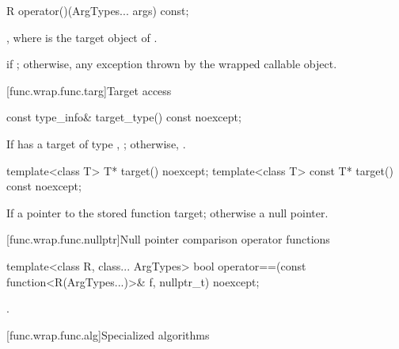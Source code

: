 %
%
\begin{itemdecl}
R operator()(ArgTypes... args) const;
\end{itemdecl}

\begin{itemdescr}
\pnum
\returns
{},
where  is the target object of .

\pnum
\throws
{} if ; otherwise, any
exception thrown by the wrapped callable object.
\end{itemdescr}

[func.wrap.func.targ]{Target access}

%
\begin{itemdecl}
const type_info& target_type() const noexcept;
\end{itemdecl}

\begin{itemdescr}
\pnum
\returns
If  has a target of type ,
  ; otherwise, .
\end{itemdescr}

%
\begin{itemdecl}
template<class T>       T* target() noexcept;
template<class T> const T* target() const noexcept;
\end{itemdecl}

\begin{itemdescr}
\pnum
\returns
If 
a pointer to the stored function target; otherwise a null pointer.
\end{itemdescr}

[func.wrap.func.nullptr]{Null pointer comparison operator functions}

%
\begin{itemdecl}
template<class R, class... ArgTypes>
  bool operator==(const function<R(ArgTypes...)>& f, nullptr_t) noexcept;
\end{itemdecl}

\begin{itemdescr}
\pnum
\returns
{}.
\end{itemdescr}

[func.wrap.func.alg]{Specialized algorithms}


